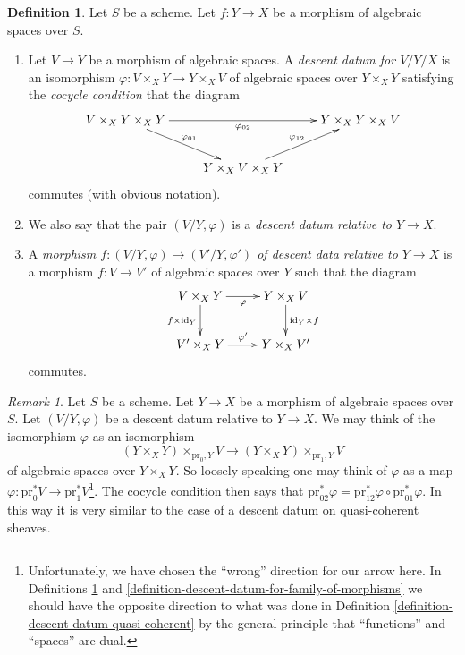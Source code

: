 \documentclass{stacks-project}
\theoremstyle{plain}
\theoremstyle{definition}
\newtheorem{definition}[subsection]{Definition}
\theoremstyle{remark}
\newtheorem{remark}[subsection]{Remark}
\numberwithin{equation}{subsection}
\begin{document}
\begin{definition}
\label{definition-descent-datum}
Let $S$ be a scheme. Let $f : Y \to X$ be a morphism of algebraic spaces
over $S$.
\begin{enumerate}
\item Let $V \to Y$ be a morphism of algebraic spaces.
A {\it descent datum for $V/Y/X$} is an isomorphism
$\varphi : V \times_X Y \to Y \times_X V$ of algebraic spaces over
$Y \times_X Y$ satisfying the {\it cocycle condition} that the diagram
$$
\xymatrix{
V \times_X Y \times_X Y \ar[rd]^{\varphi_{01}} \ar[rr]_{\varphi_{02}} &
&
Y \times_X Y \times_X V\\
&
Y \times_X V \times_X Y \ar[ru]^{\varphi_{12}}
}
$$
commutes (with obvious notation).
\item We also say that the pair $(V/Y, \varphi)$ is
a {\it descent datum relative to $Y \to X$}.
\item A {\it morphism $f : (V/Y, \varphi) \to (V'/Y, \varphi')$ of
descent data relative to $Y \to X$} is a morphism
$f : V \to V'$ of algebraic spaces over $Y$ such that
the diagram
$$
\xymatrix{
V \times_X Y \ar[r]_{\varphi} \ar[d]_{f \times \text{id}_Y} &
Y \times_X V \ar[d]^{\text{id}_Y \times f} \\
V' \times_X Y \ar[r]^{\varphi'} & Y \times_X V'
}
$$
commutes.
\end{enumerate}
\end{definition}

\begin{remark}
\label{remark-easier}
Let $S$ be a scheme.
Let $Y \to X$ be a morphism of algebraic spaces over $S$.
Let $(V/Y, \varphi)$ be a descent datum relative to $Y \to X$.
We may think of the isomorphism $\varphi$ as an isomorphism
$$
(Y \times_X Y) \times_{\text{pr}_0, Y} V
\longrightarrow
(Y \times_X Y) \times_{\text{pr}_1, Y} V
$$
of algebraic spaces over $Y \times_X Y$. So loosely speaking one may
think of $\varphi$ as a map
$\varphi : \text{pr}_0^*V \to \text{pr}_1^*V$\footnote{Unfortunately,
we have chosen the ``wrong'' direction for our arrow here. In
Definitions \ref{definition-descent-datum} and
\ref{definition-descent-datum-for-family-of-morphisms}
we should have the opposite direction to what was done in
Definition \ref{definition-descent-datum-quasi-coherent}
by the general principle that ``functions'' and ``spaces'' are dual.}.
The cocycle condition then says that
$\text{pr}_{02}^*\varphi =
\text{pr}_{12}^*\varphi \circ \text{pr}_{01}^*\varphi$.
In this way it is very similar to the case of a descent datum on
quasi-coherent sheaves.
\end{remark}
\end{document}
